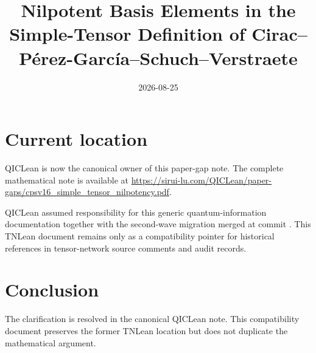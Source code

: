 \documentclass{article}
\title{Nilpotent Basis Elements in the Simple-Tensor Definition of Cirac--P\'erez-Garc\'ia--Schuch--Verstraete}
\author{}
\date{2026-08-25}
\begin{document}
\maketitle
{}

\section{Current location}

QICLean is now the canonical owner of this paper-gap note. The complete
mathematical note is available at
\url{https://sirui-lu.com/QICLean/paper-gaps/cpsv16_simple_tensor_nilpotency.pdf}.

QICLean assumed responsibility for this generic quantum-information
documentation together with the second-wave migration merged at commit
. This TNLean document remains
only as a compatibility pointer for historical references in tensor-network
source comments and audit records.

\section{Conclusion}

The clarification is resolved in the canonical QICLean note. This compatibility
document preserves the former TNLean location but does not duplicate the
mathematical argument.
\end{document}
